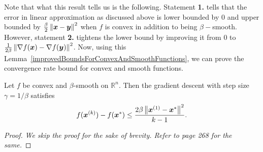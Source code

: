 \documentclass{article}
\begin{document}
\noindent Note that what this result tells us is the following.
Statement \textbf{1.} tells that the error in linear approximation as discussed above is lower bounded by 0 and upper bounded by $\frac{\beta}{2} \left\|{\bm{x}}-{\bm{y}}\right\|^2$ when $f$ is convex in addition to being $\beta-$smooth.
However, statement \textbf{2.} tightens the lower bound by improving it from 0 to $\frac{1}{2 \beta} \left\|\nabla f({\bm{x}})-\nabla f({\bm{y}})\right\|^2$.
Now, using this Lemma~\ref{improvedBoundsForConvexAndSmoothFunctions}, we can prove the convergence rate bound for convex and smooth functions.

\begin{thm}\label{thm:cvx-smth}
Let $f$ be convex and $\beta$-smooth on $\mathbb{R}^n$. Then the gradient descent with step size $\gamma = 1/\beta$ satisfies
\[
	f({\bm{x}}^{(k)}) - f({\bm{x}}^\ast) \leq \frac{2 \beta \left\|{\bm{x}}^{(1)} - {\bm{x}}^\ast\right\|^2}{k-1}.
\]
\end{thm}

\begin{proof}
\textit{
    We skip the proof for the sake of brevity.
    Refer to \cite{bubeck2015convex} page 268 for the same.
}
\end{proof}
\end{document}

